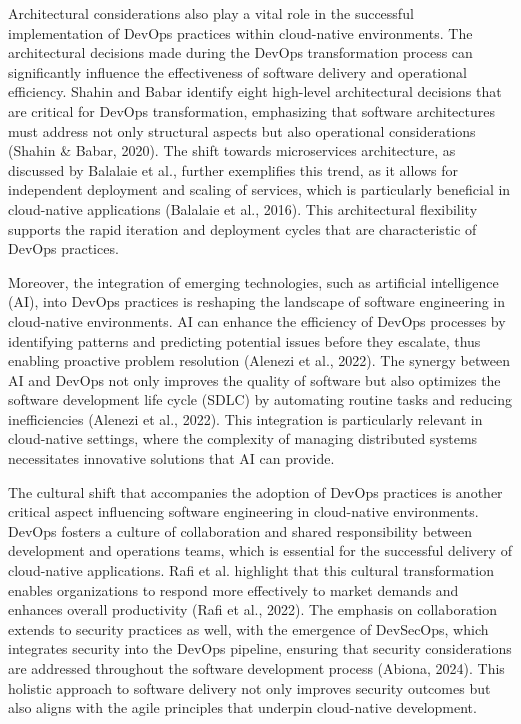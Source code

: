 Architectural considerations also play a vital role in the successful implementation of DevOps practices within cloud-native environments. The architectural decisions made during the DevOps transformation process can significantly influence the effectiveness of software delivery and operational efficiency. Shahin and Babar identify eight high-level architectural decisions that are critical for DevOps transformation, emphasizing that software architectures must address not only structural aspects but also operational considerations (Shahin & Babar, 2020). The shift towards microservices architecture, as discussed by Balalaie et al., further exemplifies this trend, as it allows for independent deployment and scaling of services, which is particularly beneficial in cloud-native applications (Balalaie et al., 2016). This architectural flexibility supports the rapid iteration and deployment cycles that are characteristic of DevOps practices.

Moreover, the integration of emerging technologies, such as artificial intelligence (AI), into DevOps practices is reshaping the landscape of software engineering in cloud-native environments. AI can enhance the efficiency of DevOps processes by identifying patterns and predicting potential issues before they escalate, thus enabling proactive problem resolution (Alenezi et al., 2022). The synergy between AI and DevOps not only improves the quality of software but also optimizes the software development life cycle (SDLC) by automating routine tasks and reducing inefficiencies (Alenezi et al., 2022). This integration is particularly relevant in cloud-native settings, where the complexity of managing distributed systems necessitates innovative solutions that AI can provide.

The cultural shift that accompanies the adoption of DevOps practices is another critical aspect influencing software engineering in cloud-native environments. DevOps fosters a culture of collaboration and shared responsibility between development and operations teams, which is essential for the successful delivery of cloud-native applications. Rafi et al. highlight that this cultural transformation enables organizations to respond more effectively to market demands and enhances overall productivity (Rafi et al., 2022). The emphasis on collaboration extends to security practices as well, with the emergence of DevSecOps, which integrates security into the DevOps pipeline, ensuring that security considerations are addressed throughout the software development process (Abiona, 2024). This holistic approach to software delivery not only improves security outcomes but also aligns with the agile principles that underpin cloud-native development.

